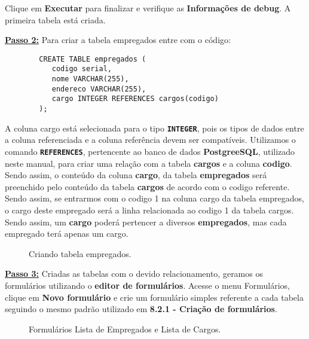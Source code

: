 \documentclass[9pt]{report}
\begin{document}
{      Clique em \textbf{Executar} para finalizar e verifique as \textbf{Informações de debug}. A primeira tabela está criada.

      \underline{\textbf{Passo 2:}} Para criar a tabela empregados
      entre com o código:

      \begin{lstlisting}
        CREATE TABLE empregados (
           codigo serial,
           nome VARCHAR(255),
           endereco VARCHAR(255),
           cargo INTEGER REFERENCES cargos(codigo)
        );
      \end{lstlisting}

      A coluna cargo está selecionada para o tipo
      \texttt{\textbf{INTEGER}}, pois os tipos de dados entre a
      coluna referenciada e a coluna referência devem ser
      compatíveis. Utilizamos o comando \texttt{\textbf{REFERENCES}},
      pertencente ao banco de dados \textbf{PostgreeSQL}, utilizado
      neste manual, para criar uma relação com a tabela
      \textbf{cargos} e a coluna \textbf{codigo}. Sendo assim, o
      conteúdo da coluna \textbf{cargo}, da tabela
      \textbf{empregados}  será preenchido pelo conteúdo da tabela
      \textbf{cargos} de acordo com o codigo referente. Sendo assim,
      se entrarmos com o codigo 1 na coluna cargo da tabela
      empregados, o cargo deste empregado será a linha relacionada
      ao codigo 1 da tabela cargos. Sendo assim, um \textbf{cargo}
      poderá pertencer a diversos \textbf{empregados}, mas cada
      empregado terá apenas um cargo.

      \begin{figure}[H]
        \caption{Criando tabela empregados.}
        \label{fig:criatableempregados}
      \end{figure}
      
      \underline{\textbf{Passo 3:}} Criadas as tabelas com o devido
      relacionamento, geramos os formulários utilizando o
      \textbf{editor de formulários}. Acesse o menu Formulários,
      clique em \textbf{Novo formulário} e crie um formulário simples
      referente a cada tabela seguindo o mesmo padrão utilizado em
      \textbf{8.2.1 - Criação de formulários}.
      
      \begin{figure}[H]
        \caption{Formulários Lista de Empregados e Lista de Cargos.}
        \label{fig:listaempregadoscargos}
      \end{figure}

}
\end{document}
